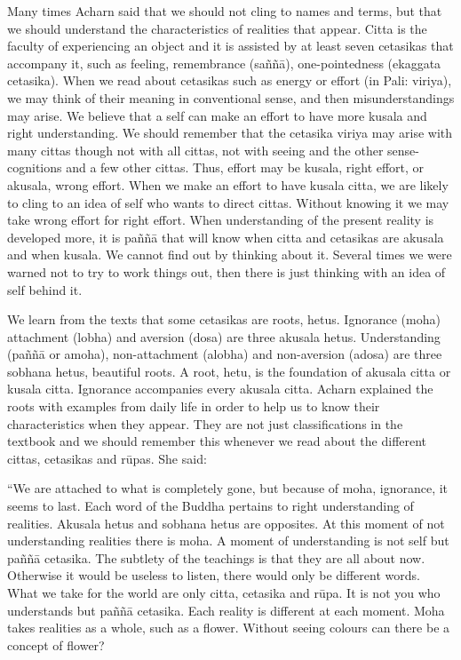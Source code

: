 Many times Acharn said that we should not cling to names and terms, but
that we should understand the characteristics of realities that appear.
Citta is the faculty of experiencing an object and it is assisted by at
least seven cetasikas that accompany it, such as feeling, remembrance
(saññā), one-pointedness (ekaggata cetasika). When we read about
cetasikas such as energy or effort (in Pali: viriya), we may think of
their meaning in conventional sense, and then misunderstandings may
arise. We believe that a self can make an effort to have more kusala and
right understanding. We should remember that the cetasika viriya may
arise with many cittas though not with all cittas, not with seeing and
the other sense-cognitions and a few other cittas. Thus, effort may be
kusala, right effort, or akusala, wrong effort. When we make an effort
to have kusala citta, we are likely to cling to an idea of self who
wants to direct cittas. Without knowing it we may take wrong effort for
right effort. When understanding of the present reality is developed
more, it is paññā that will know when citta and cetasikas are akusala
and when kusala. We cannot find out by thinking about it. Several times
we were warned not to try to work things out, then there is just
thinking with an idea of self behind it.

We learn from the texts that some cetasikas are roots, hetus. Ignorance
(moha) attachment (lobha) and aversion (dosa) are three akusala hetus.
Understanding (paññā or amoha), non-attachment (alobha) and non-aversion
(adosa) are three sobhana hetus, beautiful roots. A root, hetu, is the
foundation of akusala citta or kusala citta. Ignorance accompanies every
akusala citta. Acharn explained the roots with examples from daily life
in order to help us to know their characteristics when they appear. They
are not just classifications in the textbook and we should remember this
whenever we read about the different cittas, cetasikas and rūpas. She
said:

``We are attached to what is completely gone, but because of moha,
ignorance, it seems to last. Each word of the Buddha pertains to right
understanding of realities. Akusala hetus and sobhana hetus are
opposites. At this moment of not understanding realities there is moha.
A moment of understanding is not self but paññā cetasika. The subtlety
of the teachings is that they are all about now. Otherwise it would be
useless to listen, there would only be different words. What we take for
the world are only citta, cetasika and rūpa. It is not you who
understands but paññā cetasika. Each reality is different at each
moment. Moha takes realities as a whole, such as a flower. Without
seeing colours can there be a concept of flower?

